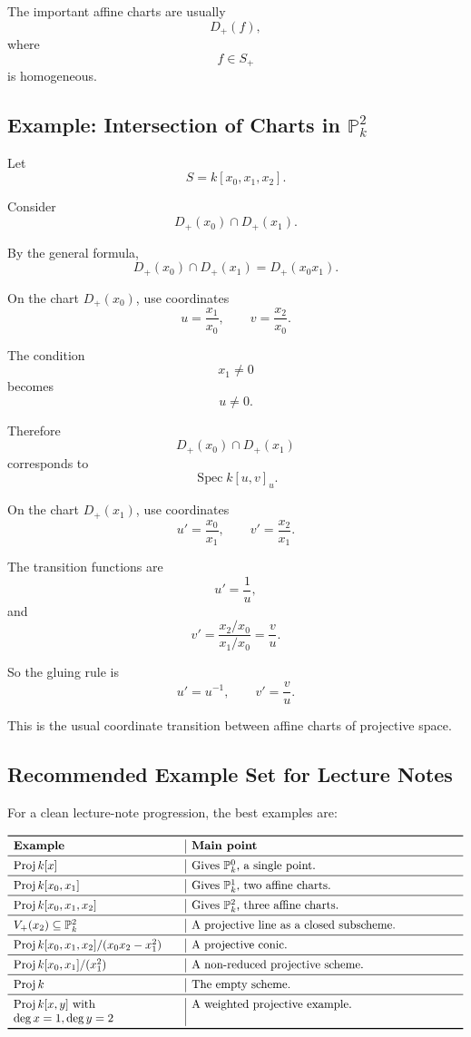 \documentclass[12pt,a4paper]{article}
\DeclareMathOperator{\Spec}{Spec}
\DeclareMathOperator{\Proj}{Proj}
\newcommand{\PP}{\mathbb P}
\theoremstyle{notespace}
\begin{document}
The important affine charts are usually
\[
D_+(f),
\]
where
\[
f\in S_+
\]
is homogeneous.

\subsection{Example: Intersection of Charts in \texorpdfstring{$\PP_k^2$}{P2}}

Let
\[
S=k[x_0,x_1,x_2].
\]

Consider
\[
D_+(x_0)\cap D_+(x_1).
\]

By the general formula,
\[
D_+(x_0)\cap D_+(x_1)
=
D_+(x_0x_1).
\]

On the chart \(D_+(x_0)\), use coordinates
\[
u=\frac{x_1}{x_0},
\qquad
v=\frac{x_2}{x_0}.
\]

The condition
\[
x_1\neq 0
\]
becomes
\[
u\neq 0.
\]

Therefore
\[
D_+(x_0)\cap D_+(x_1)
\]
corresponds to
\[
\Spec k[u,v]_u.
\]

On the chart \(D_+(x_1)\), use coordinates
\[
u'=\frac{x_0}{x_1},
\qquad
v'=\frac{x_2}{x_1}.
\]

The transition functions are
\[
u'=\frac{1}{u},
\]
and
\[
v'
=
\frac{x_2/x_0}{x_1/x_0}
=
\frac{v}{u}.
\]

So the gluing rule is
\[
\boxed{
	u'=u^{-1},
	\qquad
	v'=\frac{v}{u}.
}
\]

This is the usual coordinate transition between affine charts of projective space.

\subsection{Recommended Example Set for Lecture Notes}

For a clean lecture-note progression, the best examples are:

\[
\begin{array}{>{\raggedright\arraybackslash}p{5cm}
		|>{\raggedright\arraybackslash}p{8cm}}
	\toprule
	\textbf{Example} & \textbf{Main point} \\
	\midrule
	\(\Proj k[x]\)
	&
	Gives \(\PP_k^0\), a single point.
	\\
	\midrule
	\(\Proj k[x_0,x_1]\)
	&
	Gives \(\PP_k^1\), two affine charts.
	\\
	\midrule
	\(\Proj k[x_0,x_1,x_2]\)
	&
	Gives \(\PP_k^2\), three affine charts.
	\\
	\midrule
	\(V_+(x_2)\subseteq \PP_k^2\)
	&
	A projective line as a closed subscheme.
	\\
	\midrule
	\(\Proj k[x_0,x_1,x_2]/(x_0x_2-x_1^2)\)
	&
	A projective conic.
	\\
	\midrule
	\(\Proj k[x_0,x_1]/(x_1^2)\)
	&
	A non-reduced projective scheme.
	\\
	\midrule
	\(\Proj k\)
	&
	The empty scheme.
	\\
	\midrule
	\(\Proj k[x,y]\) with \(\deg x=1,\deg y=2\)
	&
	A weighted projective example.
	\\
	\bottomrule
\end{array}
\]
\end{document}
